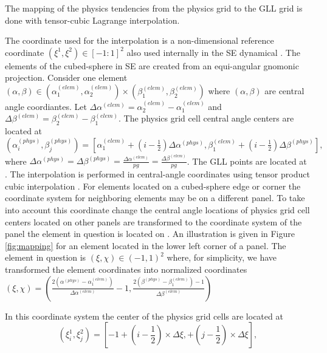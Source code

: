 \appendix \label{appendix}
The mapping of the physics tendencies from the physics grid to the GLL grid is done with tensor-cubic Lagrange interpolation. 

The coordinate used for the interpolation is a non-dimensional reference coordinate $(\xi^1,\xi^2)\in [-1:1]^2$ also used internally in the SE dynamical \citep[see, e.g., section 3.3 in ][]{LetAl2017MWR}. The elements of the cubed-sphere in SE are created from an equi-angular gnomonic projection. Consider one element $(\alpha,\beta) \in \left( \alpha^{(elem)}_1,\alpha^{(elem)}_2 \right)\times \left( \beta^{(elem)}_1,\beta^{(elem)}_2\right)$ where $(\alpha,\beta)$ are central angle coordiantes. Let $\Delta \alpha^{(elem)}=\alpha^{(elem)}_2-\alpha^{(elem)}_1$ and $\Delta \beta^{(elem)}=\beta^{(elem)}_2-\beta^{(elem)}_1$. The physics grid cell central angle centers are located at
\begin{equation}
(\alpha^{(phys)}_i,\beta^{(phys)}_j)= \left[ \alpha^{(elem)}_1+\left(i-\tfrac{1}{2}\right) \Delta \alpha^{(phys)},\beta^{(elem)}_1+\left(i-\tfrac{1}{2}\right) \Delta \beta^{(phys)}\right],
\end{equation}
where $\Delta \alpha^{(phys)}=\Delta \beta^{(phys)}=\frac{\Delta \alpha^{(elem)}}{pg}=\frac{\Delta \beta^{(elem)}}{pg}$. The GLL points are located at {\color{red}{add GLL locations...}}. The interpolation is performed in central-angle coordinates using tensor product cubic interpolation {\color{red}{(maybe cite ECMWF techinal report)}}. For elements located on a cubed-sphere edge or corner the coordinate system for neighboring elements may be on a different panel. To take into account this coordinate change the central angle locations of physics grid cell centers located on other panels are transformed to the coordinate system of the panel the element in question is located on \cite[the transformations are given in, e.g.,  ][]{NTL2005MWRb}. An illustration is given in Figure \ref{fig:mapping} for an element located in the lower left corner of a panel. The element in question is $(\xi,\chi)\in (-1,1)^2$ where, for simplicity, we have transformed the element coordinates into normalized coordinates $(\xi,\chi) = \left( \frac{ 2\left(\alpha^{(phys)}-\alpha^{(elem)}_1\right)}{\Delta \alpha^{(elem)}}-1,\frac{2\left( \beta^{(phys)}-\beta^{(elem)}_1\right)-1}{\Delta \beta^{(elem)}}\right)$



In this coordinate system the center of the physics grid cells are located at 
\begin{equation}
(\xi^1_i,\xi^2_j)=\left[ -1+\left(i-\frac{1}{2}\right) \times \Delta \xi,+\left(j-\frac{1}{2}\right) \times \Delta \xi \right],
\end{equation}


